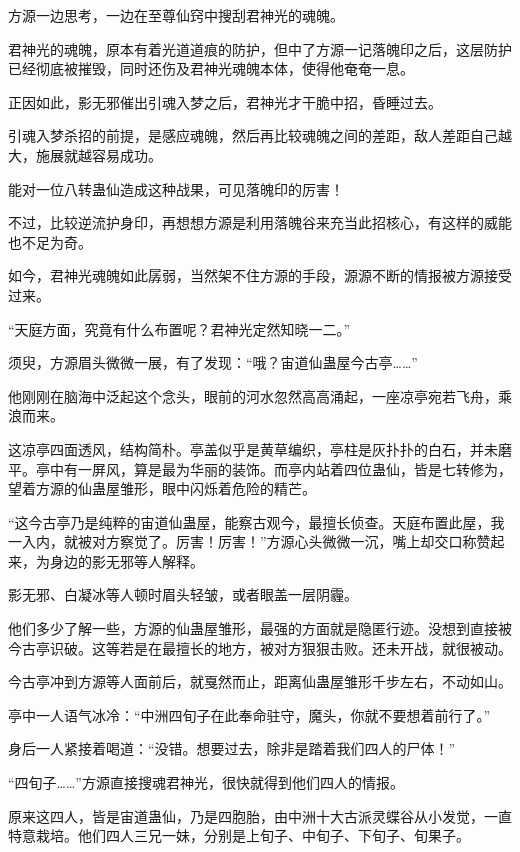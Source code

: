 \begin{this_body}
方源一边思考，一边在至尊仙窍中搜刮君神光的魂魄。

君神光的魂魄，原本有着光道道痕的防护，但中了方源一记落魄印之后，这层防护已经彻底被摧毁，同时还伤及君神光魂魄本体，使得他奄奄一息。

正因如此，影无邪催出引魂入梦之后，君神光才干脆中招，昏睡过去。

引魂入梦杀招的前提，是感应魂魄，然后再比较魂魄之间的差距，敌人差距自己越大，施展就越容易成功。

能对一位八转蛊仙造成这种战果，可见落魄印的厉害！

不过，比较逆流护身印，再想想方源是利用落魄谷来充当此招核心，有这样的威能也不足为奇。

如今，君神光魂魄如此孱弱，当然架不住方源的手段，源源不断的情报被方源接受过来。

“天庭方面，究竟有什么布置呢？君神光定然知晓一二。”

须臾，方源眉头微微一展，有了发现：“哦？宙道仙蛊屋今古亭……”

他刚刚在脑海中泛起这个念头，眼前的河水忽然高高涌起，一座凉亭宛若飞舟，乘浪而来。

这凉亭四面透风，结构简朴。亭盖似乎是黄草编织，亭柱是灰扑扑的白石，并未磨平。亭中有一屏风，算是最为华丽的装饰。而亭内站着四位蛊仙，皆是七转修为，望着方源的仙蛊屋雏形，眼中闪烁着危险的精芒。

“这今古亭乃是纯粹的宙道仙蛊屋，能察古观今，最擅长侦查。天庭布置此屋，我一入内，就被对方察觉了。厉害！厉害！”方源心头微微一沉，嘴上却交口称赞起来，为身边的影无邪等人解释。

影无邪、白凝冰等人顿时眉头轻皱，或者眼盖一层阴霾。

他们多少了解一些，方源的仙蛊屋雏形，最强的方面就是隐匿行迹。没想到直接被今古亭识破。这等若是在最擅长的地方，被对方狠狠击败。还未开战，就很被动。

今古亭冲到方源等人面前后，就戛然而止，距离仙蛊屋雏形千步左右，不动如山。

亭中一人语气冰冷：“中洲四旬子在此奉命驻守，魔头，你就不要想着前行了。”

身后一人紧接着喝道：“没错。想要过去，除非是踏着我们四人的尸体！”

“四旬子……”方源直接搜魂君神光，很快就得到他们四人的情报。

原来这四人，皆是宙道蛊仙，乃是四胞胎，由中洲十大古派灵蝶谷从小发觉，一直特意栽培。他们四人三兄一妹，分别是上旬子、中旬子、下旬子、旬果子。

\end{this_body}

